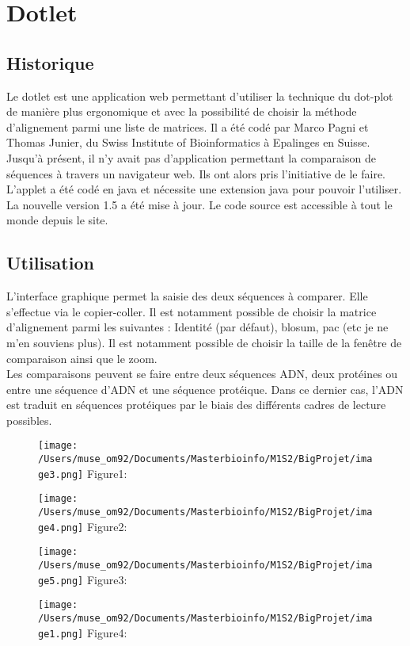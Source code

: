 \documentclass{report}
\begin{document}


\chapter{Dotlet}

\section{Historique}

Le dotlet est une application web permettant d'utiliser la technique du dot-plot de manière plus ergonomique et avec la possibilité de choisir la méthode d'alignement parmi une liste de matrices. 
Il a été codé par Marco Pagni et Thomas Junier, du Swiss Institute of Bioinformatics à Epalinges en Suisse. Jusqu'à présent, il n'y avait pas d'application permettant la comparaison de séquences à travers un navigateur web. Ils ont alors pris l'initiative de le faire.\\
L'applet a été codé en java et nécessite une extension java pour pouvoir l'utiliser. La nouvelle version 1.5 a été mise à jour. Le code source est accessible à tout le monde depuis le site.\\


\section{Utilisation}

L'interface graphique permet la saisie des deux séquences à comparer. Elle s'effectue via le copier-coller. Il est notamment possible de choisir la matrice d'alignement parmi les suivantes : Identité (par défaut), blosum, pac (etc je ne m'en souviens plus). Il est notamment possible de choisir la taille de la fenêtre de comparaison ainsi que le zoom. \\
Les comparaisons peuvent se faire entre deux séquences ADN, deux protéines ou entre une séquence d'ADN et une séquence protéique. Dans ce dernier cas, l'ADN est traduit en séquences protéiques par le biais des différents cadres de lecture possibles.\\

\begin{figure}[!h]
\centering
\texttt{[image: /Users/muse\_om92/Documents/Masterbioinfo/M1S2/BigProjet/image3.png]}
Figure1: 
\end{figure}
\begin{figure}[!h]
\centering
\texttt{[image: /Users/muse\_om92/Documents/Masterbioinfo/M1S2/BigProjet/image4.png]}
Figure2:
\end{figure}
\begin{figure}[!h]
\centering
\texttt{[image: /Users/muse\_om92/Documents/Masterbioinfo/M1S2/BigProjet/image5.png]}
Figure3:
\end{figure}
\begin{figure}[!h]
\centering
\texttt{[image: /Users/muse\_om92/Documents/Masterbioinfo/M1S2/BigProjet/image1.png]}
Figure4:
\end{figure}
\end{document}
